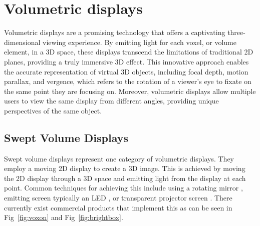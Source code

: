 \section{Volumetric displays}

Volumetric displays \cite{1492264} are a promising technology that offers a captivating three-dimensional viewing experience. By emitting light for each voxel, or volume element, in a 3D space, these displays transcend the limitations of traditional 2D planes, providing a truly immersive 3D effect. This innovative approach enables the accurate representation of virtual 3D objects, including focal depth, motion parallax, and vergence, which refers to the rotation of a viewer's eye to fixate on the same point they are focusing on. Moreover, volumetric displays allow multiple users to view the same display from different angles, providing unique perspectives of the same object.

\subsection{Swept Volume Displays}
Swept volume displays represent one category of volumetric displays. They employ a moving 2D display to create a 3D image. This is achieved by moving the 2D display through a 3D space and emitting light from the display at each point. Common techniques for achieving this include using a rotating mirror \cite{10.1117/12.480930}, emitting screen typically an LED \cite{Gately:11}, or transparent projector screen \cite{keane_volumetric_2016}. There currently exist commercial products that implement this as can be seen in Fig~\ref{fig:voxon} and Fig~\ref{fig:brightbox}.

